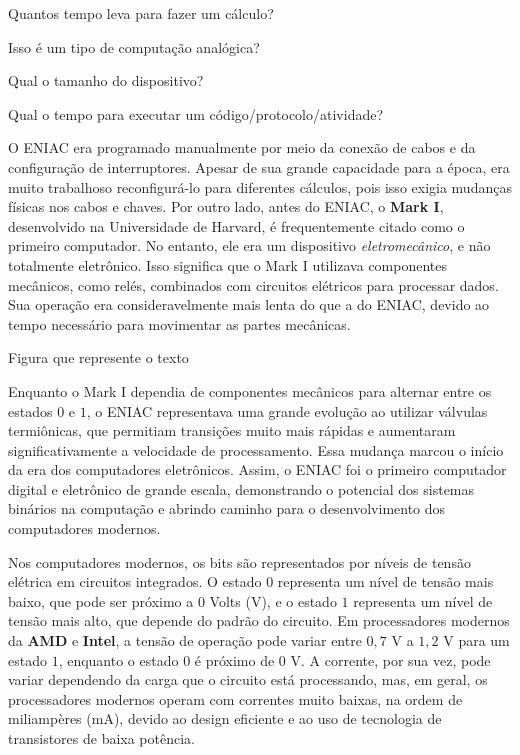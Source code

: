 {\color{red} Quantos tempo leva para fazer um cálculo?}

{\color{red} Isso é um tipo de computação analógica?}

{\color{red} Qual o tamanho do dispositivo?}

{\color{red} Qual o tempo para executar um código/protocolo/atividade?}

O ENIAC era programado manualmente por meio da conexão de cabos e da configuração de interruptores. Apesar de sua grande capacidade para a época, era muito trabalhoso reconfigurá-lo para diferentes cálculos, pois isso exigia mudanças físicas nos cabos e chaves. Por outro lado, antes do ENIAC, o \textbf{Mark I}, desenvolvido na Universidade de Harvard, é frequentemente citado como o primeiro computador. No entanto, ele era um dispositivo \textit{eletromecânico}, e não totalmente eletrônico. Isso significa que o Mark I utilizava componentes mecânicos, como relés, combinados com circuitos elétricos para processar dados. Sua operação era consideravelmente mais lenta do que a do ENIAC, devido ao tempo necessário para movimentar as partes mecânicas.

{\color{red} Figura que represente o texto}

Enquanto o Mark I dependia de componentes mecânicos para alternar entre os estados \(0\) e \(1\), o ENIAC representava uma grande evolução ao utilizar válvulas termiônicas, que permitiam transições muito mais rápidas e aumentaram significativamente a velocidade de processamento. Essa mudança marcou o início da era dos computadores eletrônicos. Assim, o ENIAC foi o primeiro computador digital e eletrônico de grande escala, demonstrando o potencial dos sistemas binários na computação e abrindo caminho para o desenvolvimento dos computadores modernos.

Nos computadores modernos, os bits são representados por níveis de tensão elétrica em circuitos integrados. O estado \(0\) representa um nível de tensão mais baixo, que pode ser próximo a \(0\) Volts (V), e o estado \(1\) representa um nível de tensão mais alto, que depende do padrão do circuito. Em processadores modernos da \textbf{AMD} e \textbf{Intel}, a tensão de operação pode variar entre \(0,7\) V a \(1,2\) V para um estado \(1\), enquanto o estado \(0\) é próximo de \(0\) V. A corrente, por sua vez, pode variar dependendo da carga que o circuito está processando, mas, em geral, os processadores modernos operam com correntes muito baixas, na ordem de miliampères (mA), devido ao design eficiente e ao uso de tecnologia de transistores de baixa potência.

